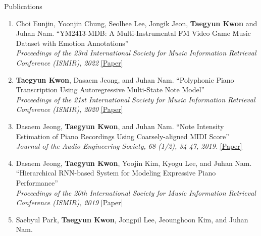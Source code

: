 \begin{rSection}{Publications}
\begin{enumerate}
\begin{minipage}[t]{\linewidth}
``A Study of Audio Mixing Methods for Piano Transcription in Violin-Piano Ensembles''\\\textit{Proceedings of the IEEE International Conference on Acoustics, Speech and Signal Processing (ICASSP), 2023}
\href{https://ieeexplore.ieee.org/stamp/stamp.jsp?arnumber=10095061}{[Paper]}
\end{minipage}
\item \begin{minipage}[t]{\linewidth}Choi Eunjin, Yoonjin Chung, Seolhee Lee, Jongik Jeon, \textbf{Taegyun Kwon} and Juhan Nam.
``YM2413-MDB: A Multi-Instrumental FM Video Game Music Dataset with Emotion Annotations''\\\textit{Proceedings of the 23rd International Society for Music Information Retrieval Conference (ISMIR), 2022}
\href{https://archives.ismir.net/ismir2022/paper/000011.pdf}{[Paper]}
\end{minipage}
\item \begin{minipage}[t]{\linewidth}\textbf{Taegyun Kwon}, Dasaem Jeong, and Juhan Nam.
``Polyphonic Piano Transcription Using Autoregressive Multi-State Note Model''\\\textit{Proceedings of the 21st International Society for Music Information Retrieval Conference (ISMIR), 2020}
\href{https://arxiv.org/abs/2010.01104}{[Paper]}
\end{minipage}
\item \begin{minipage}[t]{\linewidth}Dasaem Jeong, \textbf{Taegyun Kwon}, and Juhan Nam.
``Note Intensity Estimation of Piano Recordings Using Coarsely-aligned MIDI Score''\\\textit{Journal of the Audio Engineering Society, 68 (1/2), 34-47, 2019.}
\href{http://www.aes.org/e-lib/browse.cfm?elib=20716}{[Paper]}
\end{minipage}
\item \begin{minipage}[t]{\linewidth}Dasaem Jeong, \textbf{Taegyun Kwon}, Yoojin Kim, Kyogu Lee, and Juhan Nam.
``Hierarchical RNN-based System for Modeling Expressive Piano Performance''\\\textit{Proceedings of the 20th International Society for Music Information Retrieval Conference (ISMIR), 2019}
\href{http://archives.ismir.net/ismir2019/paper/000112.pdf}{[Paper]}
\end{minipage}
\item \begin{minipage}[t]{\linewidth}Saebyul Park, \textbf{Taegyun Kwon}, Jongpil Lee, Jeounghoon Kim, and Juhan Nam.

\end{minipage}
\end{enumerate}
\end{rSection}
